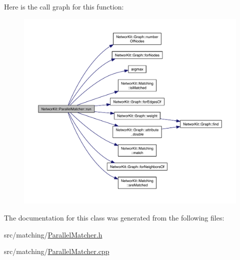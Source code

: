 Here is the call graph for this function\-:\nopagebreak
\begin{figure}[H]
\begin{center}
\leavevmode
\includegraphics[width=350pt]{class_networ_kit_1_1_parallel_matcher_a9d02fd78f3c61b62fbd7110bd25c91fd_cgraph}
\end{center}
\end{figure}




The documentation for this class was generated from the following files\-:\begin{DoxyCompactItemize}
\item 
src/matching/\hyperlink{_parallel_matcher_8h}{Parallel\-Matcher.\-h}\item 
src/matching/\hyperlink{_parallel_matcher_8cpp}{Parallel\-Matcher.\-cpp}\end{DoxyCompactItemize}

